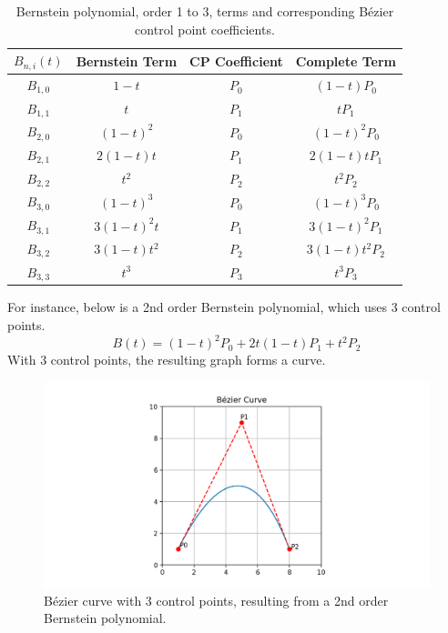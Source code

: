 \documentclass[12pt,letterpaper]{article}
\begin{document}
\begin{table}[H]
    \centering
    \begin{tabular}{ | c | c c | c | }
        \hline
        $B_{n,i} (t)$ & Bernstein Term & CP Coefficient & Complete Term \\
        \hline
        $B_{1,0}$ & $1-t$ 		& $P_0$ & $(1-t)P_0$ 	    \\
        \hline
        $B_{1,1}$ & $t$ 		& $P_1$ & $tP_1$ 		    \\
        \hline
        $B_{2,0}$ & $(1-t)^2$ 	& $P_0$ & $(1-t)^2P_0$ 	    \\
        \hline
        $B_{2,1}$ & $2(1-t)t$ 	& $P_1$ & $2(1-t)tP_1$ 	    \\
        \hline
        $B_{2,2}$ & $t^2$ 		& $P_2$ & $t^2P_2$ 	        \\
        \hline
        $B_{3,0}$ & $(1-t)^3$ 	& $P_0$ & $(1-t)^3P_0$ 	    \\
        \hline
        $B_{3,1}$ & $3(1-t)^2t$ 	& $P_1$ & $3(1-t)^2P_1$	\\
        \hline
        $B_{3,2}$ & $3(1-t)t^2$ 	& $P_2$ & $3(1-t)t^2P_2$\\
        \hline
        $B_{3,3}$ & $t^3$ 		& $P_3$ & $t^3P_3$ 	        \\
        \hline
    \end{tabular}
    \caption{Bernstein polynomial, order 1 to 3, terms and corresponding B\'ezier control point coefficients.}
    \label{tab:coeffs}
\end{table}

For instance, below is a 2nd order Bernstein polynomial, which uses 3 control points.
$$B(t)= (1-t)^2 P_0+2t(1-t) P_1+t^2 P_2$$
With 3 control points, the resulting graph forms a curve.

\begin{figure}[H]
    \includegraphics[width=15cm]{Figure_4}
    \centering
    \caption{B\'ezier curve with 3 control points, resulting from a 2nd order Bernstein polynomial.}
    \label{fig:bez3}
\end{figure}
\end{document}
